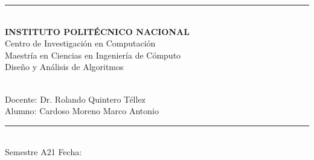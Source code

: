 \begin{titlepage}
\begin{center}
        \vspace*{2mm}
        \rule{\textwidth}{1.5pt}\\
        \vspace*{5mm}
        \textbf{\Large INSTITUTO POLITÉCNICO NACIONAL}\\
        \vspace*{8mm}
        {\Large Centro de Investigación en Computación}\\
        \vspace{8mm}
        {\Large Maestría en Ciencias en Ingeniería de Cómputo}\\
        \vspace{19mm}
        {\Large Diseño y Análisis de Algoritmos}\\
        \vspace{49mm}




        \textbf{\large \tarea}\\





        \vspace*{48mm}
        {\large Docente: Dr. Rolando Quintero Téllez}\\
        \vspace*{20mm}
        {\large Alumno: Cardoso Moreno Marco Antonio}\\
        \vspace*{10mm}
        \rule{\textwidth}{1.5pt}\\
        {\large Semestre A21} \hfill {\large Fecha: \fecha}
    \end{center}
\end{titlepage}

\newpage
\thispagestyle{empty}

\newpage
{}


\clearpage
\tableofcontents

\clearpage
{}
\listoffigures

\clearpage
{}
\listoftables

\clearpage
{}
